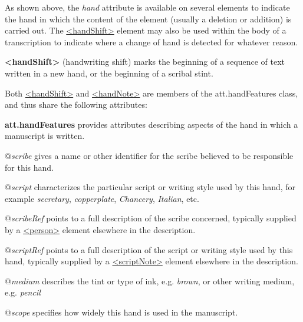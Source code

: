 As shown above, the {\itshape hand} attribute is available on several elements to indicate the hand in which the content of the element (usually a deletion or addition) is carried out. The \hyperref[TEI.handShift]{<handShift>} element may also be used within the body of a transcription to indicate where a change of hand is detected for whatever reason. 
\begin{sansreflist}
  
\item [\textbf{<handShift>}] (handwriting shift) marks the beginning of a sequence of text written in a new hand, or the beginning of a scribal stint.
\end{sansreflist}
\par
Both \hyperref[TEI.handShift]{<handShift>} and \hyperref[TEI.handNote]{<handNote>} are members of the \textsf{att.handFeatures} class, and thus share the following attributes: 
\begin{sansreflist}
  
\item [\textbf{att.handFeatures}] provides attributes describing aspects of the hand in which a manuscript is written.\hfil\\[-10pt]\begin{sansreflist}
    \item[@{\itshape scribe}]
  gives a name or other identifier for the scribe believed to be responsible for this hand.
    \item[@{\itshape script}]
  characterizes the particular script or writing style used by this hand, for example \textit{secretary}, \textit{copperplate}, \textit{Chancery}, \textit{Italian}, etc.
    \item[@{\itshape scribeRef}]
  points to a full description of the scribe concerned, typically supplied by a \hyperref[TEI.person]{<person>} element elsewhere in the description.
    \item[@{\itshape scriptRef}]
  points to a full description of the script or writing style used by this hand, typically supplied by a \hyperref[TEI.scriptNote]{<scriptNote>} element elsewhere in the description.
    \item[@{\itshape medium}]
  describes the tint or type of ink, e.g. \textit{brown}, or other writing medium, e.g. \textit{pencil}
    \item[@{\itshape scope}]
  specifies how widely this hand is used in the manuscript.
\end{sansreflist}  
\end{sansreflist}
